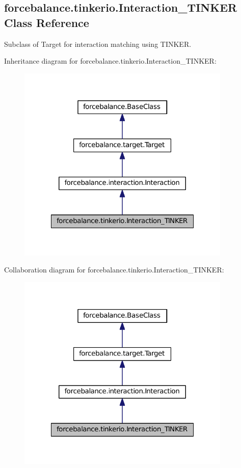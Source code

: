 \hypertarget{classforcebalance_1_1tinkerio_1_1Interaction__TINKER}{\subsection{forcebalance.\-tinkerio.\-Interaction\-\_\-\-T\-I\-N\-K\-E\-R \-Class \-Reference}
\label{classforcebalance_1_1tinkerio_1_1Interaction__TINKER}
}


\-Subclass of \-Target for interaction matching using \-T\-I\-N\-K\-E\-R.  




\-Inheritance diagram for forcebalance.\-tinkerio.\-Interaction\-\_\-\-T\-I\-N\-K\-E\-R\-:
\nopagebreak
\begin{figure}[H]
\begin{center}
\leavevmode
\includegraphics[width=288pt]{classforcebalance_1_1tinkerio_1_1Interaction__TINKER__inherit__graph}
\end{center}
\end{figure}


\-Collaboration diagram for forcebalance.\-tinkerio.\-Interaction\-\_\-\-T\-I\-N\-K\-E\-R\-:
\nopagebreak
\begin{figure}[H]
\begin{center}
\leavevmode
\includegraphics[width=288pt]{classforcebalance_1_1tinkerio_1_1Interaction__TINKER__coll__graph}
\end{center}
\end{figure}
